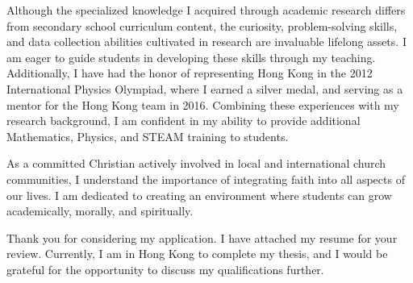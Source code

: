 \documentclass[11pt, a4paper]{awesome-cv}
\begin{document}
\begin{cvletter}
Although the specialized knowledge I acquired through academic research differs from secondary school curriculum content, the curiosity, problem-solving skills, and data collection abilities cultivated in research are invaluable lifelong assets. I am eager to guide students in developing these skills through my teaching. Additionally, I have had the honor of representing Hong Kong in the 2012 International Physics Olympiad, where I earned a silver medal, and serving as a mentor for the Hong Kong team in 2016. Combining these experiences with my research background, I am confident in my ability to provide additional Mathematics, Physics, and STEAM training to students.

As a committed Christian actively involved in local and international church communities, I understand the importance of integrating faith into all aspects of our lives. I am dedicated to creating an environment where students can grow academically, morally, and spiritually.

Thank you for considering my application. I have attached my resume for your review. Currently, I am in Hong Kong to complete my thesis, and I would be grateful for the opportunity to discuss my qualifications further.

\end{cvletter}


\makeletterclosing
\end{document}
